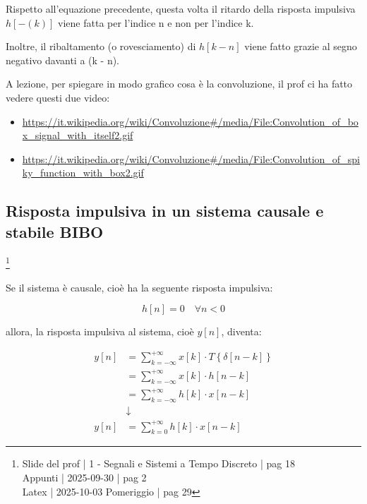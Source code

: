 \begin{tcolorbox}
    Rispetto all'equazione precedente, questa volta il ritardo della risposta impulsiva $h \left[ - (k)\right]$ viene fatta per l'indice n e non per l'indice k. \newline 

    Inoltre, il ribaltamento (o rovesciamento) di $h \left[ k - n\right]$ viene fatto grazie al segno negativo davanti a (k - n). \newline 

    A lezione, per spiegare in modo grafico cosa è la convoluzione, il prof ci ha fatto vedere questi due video: 

    \begin{itemize}
        \item \url{https://it.wikipedia.org/wiki/Convoluzione#/media/File:Convolution_of_box_signal_with_itself2.gif} 
        \item \url{https://it.wikipedia.org/wiki/Convoluzione#/media/File:Convolution_of_spiky_function_with_box2.gif}
    \end{itemize}

\end{tcolorbox} 

\newpage 

\subsection{Risposta impulsiva in un sistema causale e stabile BIBO}

\footnote{ 
    Slide del prof | 1 - Segnali e Sistemi a Tempo Discreto | pag 18\\
    Appunti | 2025-09-30 | pag 2 \\ 
    Latex | 2025-10-03 Pomeriggio | pag 29
}

Se il sistema è causale, cioè ha la seguente risposta impulsiva: 

{
    \Large 
    \begin{equation}
        h \left[ n\right] = 0 \quad \forall n < 0
    \end{equation}
}

allora, la risposta impulsiva al sistema, cioè $y [n]$, diventa: 

{
    \Large 
    \begin{equation}
        \begin{split}
        y \left[ n\right]
        &= 
        \sum_{k = - \infty}^{+ \infty}
        x \left[ k\right]
        \cdot 
        T \left\{ \delta \left[ n - k\right]\right\}
        \\
        &=  
        \sum_{k = - \infty}^{+ \infty}
        x \left[ k\right]
        \cdot 
        h \left[n - k\right]
        \\
        &= 
        \sum_{k = - \infty}^{+ \infty}
        h \left[ k\right]
        \cdot 
        x \left[n - k\right]
        \\
        &\downarrow
        \\
        y \left[ n\right]
        &= 
        \sum_{k = 0}^{+ \infty}
        h \left[ k\right]
        \cdot 
        x \left[n - k\right]
    \end{split}
    \end{equation}
}

